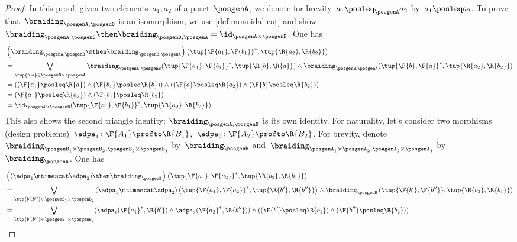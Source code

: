 \begin{proof}
    In this proof, given two elements~$a_1,a_2$ of a poset~$\posgenA$, we denote for brevity~$a_1 \posleq_\posgenA a_2$ by~$a_1 \posleq a_2$.
    To prove that~$\braiding_{\posgenA,\posgenB}$ is an isomorphism, we use \cref{def:monoidal-cat} and show~$\braiding_{\posgenA,\posgenB}\then \braiding_{\posgenB,\posgenA}=\id_{\posgenA\times \posgenB}$.
    One has
    \begin{equation}
        \begin{aligned}
            &\left( \braiding_{\posgenA,\posgenB}\mthen \braiding_{\posgenB,\posgenA}\right) \left( \tup{\F{a_1},\F{b_1}}^*,\tup{\R{a_2},\R{b_2}}\right)\\
            &=\bigvee_{\tup{b,a}\in \posgenB\times \posgenA}\braiding_{\posgenA,\posgenB}(\tup{\F{a_1},\F{b_1}}^*,\tup{\R{b},\R{a}})\wedge \braiding_{\posgenB,\posgenA}(\tup{\F{b},\F{a}}^*,\tup{\R{a_2},\R{b_2}})\\
            &=\left( (\F{a_1}\posleq \R{a}) \wedge (\F{b_1}\posleq \R{b})\right)\wedge \left((\F{a}\posleq \R{a_2}) \wedge (\F{b}\posleq \R{b_2})\right)\\
            &=(\F{a_1}\posleq \R{a_2})\wedge (\F{b_1}\posleq \R{b_2})\\
            &=\id_{\posgenA\times \posgenB}(\tup{\F{a_1},\F{b_1}}^*,\tup{\R{a_2},\R{b_2}}).
        \end{aligned}
    \end{equation}
    This also shows the second triangle identity: $\braiding_{\posgenA,\posgenB}$ is its own identity.
    For naturality, let's consider two morphisms (design problems)~$\adpa_1\colon \F{A_1}\profto \R{B_1}$,~$\adpa_2\colon \F{A_2}\profto \R{B_2}$.
    For brevity, denote~$\braiding_{\posgenB_1\times \posgenB_2,\posgenB_2\times \posgenB_1}$ by~$\braiding_\posgenB$ and~$\braiding_{\posgenA_1\times \posgenA_2,\posgenA_2\times \posgenA_1}$ by~$\braiding_\posgenA$.
    One has
    \begin{equation}
        \begin{aligned}
            &\left((\adpa_1\mtimescat \adpa_2)\then \braiding_\posgenB \right)\left( \tup{\F{a_1},\F{a_2}}^*,\tup{\R{b_2},\R{b_1}}\right)\\
            &=\bigvee_{\tup{b',b''}\in \posgenB_1\times \posgenB_2} \left(\adpa_1\mtimescat \adpa_2\right) \left( \tup{\F{a_1},\F{a_2}}^*,\tup{\R{b'},\R{b''}}\right)\wedge \braiding_\posgenB\left(\tup{\F{b'},\F{b''}},\tup{\R{b_2},\R{b_1}} \right)\\
            &=\bigvee_{\tup{b',b''}\in \posgenB_1\times \posgenB_2}(\adpa_1(\F{a_1}^*,\R{b'})\wedge \adpa_2(\F{a_2}^*,\R{b''}))\wedge (\left(\F{b'}\posleq \R{b_1}\right) \wedge \left(\F{b''}\posleq \R{b_2}\right))\\

\end{aligned}
\end{equation}
\end{proof}
